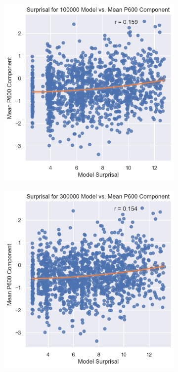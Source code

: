 \documentclass{IEEEtran}
\begin{document}
\begin{figure}[h]
\centering
\begin{subfigure}{0.4\textwidth}
    \centering
    \includegraphics[width=\textwidth]{surprisal_vs_p600/100000.png}
\end{subfigure}
\begin{subfigure}{0.4\textwidth}
    \centering
    \includegraphics[width=\textwidth]{surprisal_vs_p600/300000.png}
\end{subfigure}
\end{figure}
\end{document}
